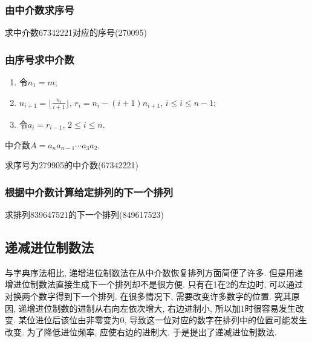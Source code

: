         \subsubsection{由中介数求序号}

            \begin{example}
                求中介数67342221对应的序号(270095)
            \end{example}

        \subsubsection{由序号求中介数}

            \begin{algorithm}
                \begin{enumerate}
                    \item 令$n_1=m$;
                    \item $n_{i+1}=\lfloor\frac{n_i}{i+1}\rfloor$, $r_i=n_i-(i+1)n_{i+1}$, $i\leqslant i\leqslant n-1$;
                    \item 令$a_i=r_{i-1}$, $2\leqslant i\leqslant n$.
                \end{enumerate}
                中介数$A=a_na_{n-1}\cdots a_3a_2$.
            \end{algorithm}

            \begin{example}
                求序号为279905的中介数(67342221)
            \end{example}

        \subsubsection{根据中介数计算给定排列的下一个排列}

            \begin{example}
                求排列839647521的下一个排列(849617523)
            \end{example}

    \subsection{递减进位制数法}

        与字典序法相比, 递增进位制数法在从中介数恢复排列方面简便了许多. 但是用递增进位制数法直接生成下一个排列却不是很方便. 只有在1在2的左边时, 可以通过对换两个数字得到下一个排列. 在很多情况下, 需要改变许多数字的位置. 究其原因, 递增进位制数的进制从右向左依次增大, 右边进制小, 所以加1时很容易发生改变. 某位进位后该位由非零变为0, 导致这一位对应的数字在排列中的位置可能发生改变. 为了降低进位频率, 应使右边的进制大. 于是提出了递减进位制数法. 

